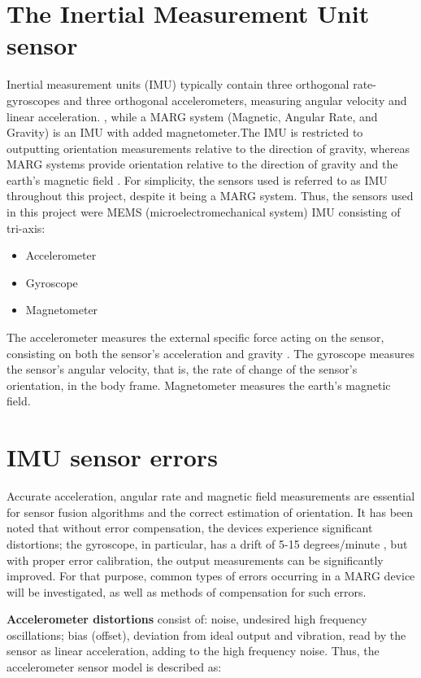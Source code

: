 \section{The Inertial Measurement Unit sensor} 
 
Inertial measurement units (IMU) typically contain three orthogonal rate-gyroscopes and three orthogonal accelerometers, measuring angular velocity and linear acceleration.  \cite{UCAM-CL-TR-696}, while a MARG system (Magnetic, Angular Rate, and Gravity) is an IMU with added magnetometer.The  IMU is restricted to outputting orientation measurements relative to the direction of gravity, whereas MARG systems provide orientation relative to the direction of gravity and the earth's magnetic field \cite{madgwick2010efficient}. For simplicity, the sensors used is referred to as IMU throughout this project, despite it being a MARG system. Thus, the sensors used in this project were MEMS (microelectromechanical system) IMU consisting of tri-axis: 
 
\begin{itemize}
\item Accelerometer
\item Gyroscope
\item Magnetometer
\end{itemize}

The accelerometer measures the external specific force acting on the sensor, consisting on both the sensor’s acceleration and gravity \cite{kok2017using}. The gyroscope measures the sensor's angular velocity, that is, the rate of change of the sensor's orientation, in the body frame. Magnetometer measures the earth’s magnetic field.  
 
\section{IMU sensor errors} 

Accurate acceleration, angular rate and magnetic field measurements are essential for sensor fusion algorithms and the correct estimation of orientation. It has been noted that without error compensation, the devices experience significant distortions; the gyroscope, in particular, has a drift of 5-15 degrees/minute  \cite{barshan1995inertial}, but with proper error calibration, the output measurements can be significantly improved. For that purpose, common types of errors occurring in a MARG device will be investigated, as well as methods of compensation for such errors. 

\textbf{Accelerometer distortions} consist of: noise, undesired high frequency oscillations; bias (offset), deviation from ideal output and vibration, read by the sensor as linear acceleration, adding to the high frequency noise. Thus, the accelerometer sensor model is described as:

